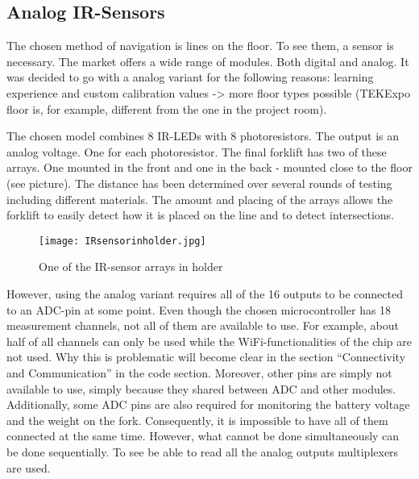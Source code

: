 \documentclass[../report.tex]{subfiles}
\begin{document}
\subsection{Analog IR-Sensors}
The chosen method of navigation is lines on the floor. To see them, a sensor is necessary.
The market offers a wide range of modules. Both digital and analog. It was decided to go with 
a analog variant for the following reasons: learning experience and custom calibration values -> more
floor types possible (TEKExpo floor is, for example, different from the one in the project room).  

The chosen model combines 8 IR-LEDs with 8 photoresistors. The output is an analog voltage. One for each photoresistor.
The final forklift has two of these arrays. One mounted in the front and one in the back - mounted
close to the floor (see picture). The distance has been determined over several rounds of testing 
including different materials. The amount and placing of the arrays allows the forklift to easily detect
how it is placed on the line and to detect intersections.  
\begin{figure}[h!]
    \centering
    \texttt{[image: IRsensorinholder.jpg]}
    \caption{One of the IR-sensor arrays in holder}
 \end{figure}

However, using the analog variant requires all of the 16 outputs to be connected to an ADC-pin at some point.
Even though the chosen microcontroller has 18 measurement channels, not all of them are available to use.
For example, about half of all channels can only be used while the WiFi-functionalities of the chip are not used.
Why this is problematic will become clear in the section ``Connectivity and Communication'' in the code section.
Moreover, other pins are simply not available to use, simply because they shared between ADC and other modules.
Additionally, some ADC pins are also required for monitoring the battery voltage and the weight on the fork.
Consequently, it is impossible to have all of them connected at the same time. However, what cannot be done 
simultaneously can be done sequentially. To see be able to read all the analog outputs multiplexers are used.
\end{document}

